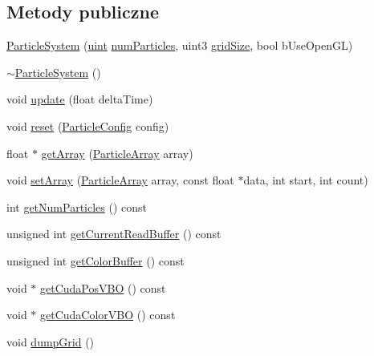 \subsection*{Metody publiczne}
\begin{DoxyCompactItemize}
\item 
\hyperlink{class_particle_system_a8a2be3e93616aa694801369c8b8d12cb}{Particle\-System} (\hyperlink{particles__kernel_8cuh_a91ad9478d81a7aaf2593e8d9c3d06a14}{uint} \hyperlink{particles_8cpp_a05b8a90212054a3eb1a036ae0c269596}{num\-Particles}, uint3 \hyperlink{particles_8cpp_aefe301f4cc6d6838e3627b5970e855a9}{grid\-Size}, bool b\-Use\-Open\-G\-L)
\item 
\hyperlink{class_particle_system_a6bc725349a763b9d6817950cde16a93f}{$\sim$\-Particle\-System} ()
\item 
void \hyperlink{class_particle_system_a166fd86f020b6024d7d42723762d7cb2}{update} (float delta\-Time)
\item 
void \hyperlink{class_particle_system_a519070812dd9eb349f270c793c5f64b6}{reset} (\hyperlink{class_particle_system_a1dca3996c8068602412ef9f7826605d1}{Particle\-Config} config)
\item 
float $\ast$ \hyperlink{class_particle_system_a8bdfaa6198651ef0ceb8be489ecd78e3}{get\-Array} (\hyperlink{class_particle_system_a332fbe57a36aaea5c18b4ea4fba6bbb3}{Particle\-Array} array)
\item 
void \hyperlink{class_particle_system_aa792a66680e800832059854aab0d594d}{set\-Array} (\hyperlink{class_particle_system_a332fbe57a36aaea5c18b4ea4fba6bbb3}{Particle\-Array} array, const float $\ast$data, int start, int count)
\item 
int \hyperlink{class_particle_system_a6f89e8d4c3e3e328088b7d652cee84b0}{get\-Num\-Particles} () const 
\item 
unsigned int \hyperlink{class_particle_system_ae9f149d6b7c3b148fc397473c7c3c2e2}{get\-Current\-Read\-Buffer} () const 
\item 
unsigned int \hyperlink{class_particle_system_a5d300a37ebf1a2fb8575f82ced6a208f}{get\-Color\-Buffer} () const 
\item 
void $\ast$ \hyperlink{class_particle_system_a2c8214a5bcd9d9c24d16e1f0063c06d6}{get\-Cuda\-Pos\-V\-B\-O} () const 
\item 
void $\ast$ \hyperlink{class_particle_system_af89375a9131276f941dccefa7840adda}{get\-Cuda\-Color\-V\-B\-O} () const 
\item 
void \hyperlink{class_particle_system_a722bdb7cc940f052400a69fe9569a49e}{dump\-Grid} ()

\end{DoxyCompactItemize}
